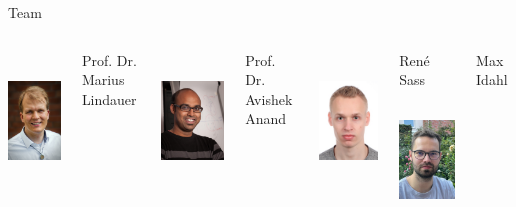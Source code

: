 \documentclass[aspectratio=169]{../latex_main/tntbeamer}  %
\begin{document}
\begin{frame}[c]{Team}

\begin{columns}[T]

\centering
\includegraphics[height=10em]{./figures/marius_lindauer_small}

Prof. Dr.\\ Marius Lindauer

\centering
\includegraphics[height=10em]{./figures/avishek-homepage}

Prof. Dr.\\ Avishek Anand

\centering
\includegraphics[height=10em]{./figures/rene_sass}

Ren\'e Sass\\

\centering
\includegraphics[height=10em]{./figures/max_portrait.jpg}

Max Idahl\\

\end{columns}

\end{frame}
\end{document}
